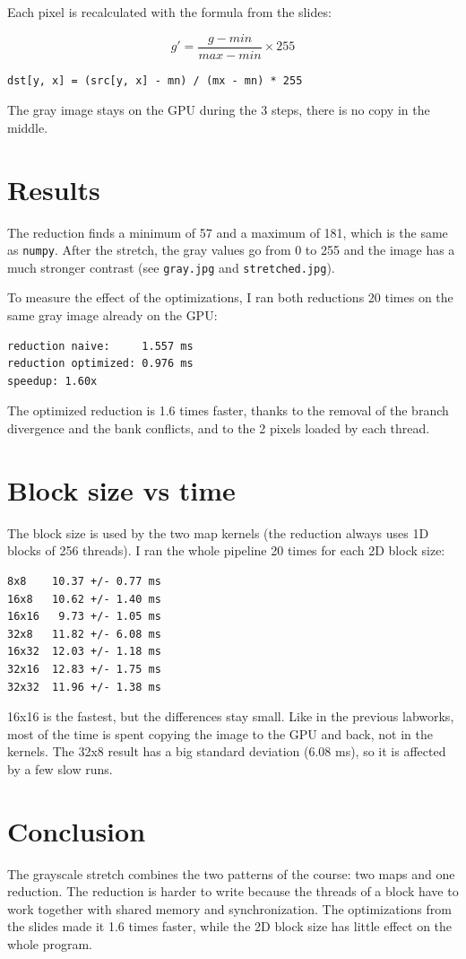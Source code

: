 \documentclass{report}
\begin{document}
Each pixel is recalculated with the formula from the slides:

\[
g' = \frac{g - min}{max - min} \times 255
\]

\begin{verbatim}
dst[y, x] = (src[y, x] - mn) / (mx - mn) * 255
\end{verbatim}

The gray image stays on the GPU during the 3 steps, there is no copy in the middle.

\section*{Results}

The reduction finds a minimum of 57 and a maximum of 181, which is the same as \texttt{numpy}. After the stretch, the gray values go from 0 to 255 and the image has a much stronger contrast (see \texttt{gray.jpg} and \texttt{stretched.jpg}).

To measure the effect of the optimizations, I ran both reductions 20 times on the same gray image already on the GPU:

\begin{verbatim}
reduction naive:     1.557 ms
reduction optimized: 0.976 ms
speedup: 1.60x
\end{verbatim}

The optimized reduction is 1.6 times faster, thanks to the removal of the branch divergence and the bank conflicts, and to the 2 pixels loaded by each thread.

\section*{Block size vs time}

The block size is used by the two map kernels (the reduction always uses 1D blocks of 256 threads). I ran the whole pipeline 20 times for each 2D block size:

\begin{verbatim}
8x8    10.37 +/- 0.77 ms
16x8   10.62 +/- 1.40 ms
16x16   9.73 +/- 1.05 ms
32x8   11.82 +/- 6.08 ms
16x32  12.03 +/- 1.18 ms
32x16  12.83 +/- 1.75 ms
32x32  11.96 +/- 1.38 ms
\end{verbatim}

16x16 is the fastest, but the differences stay small. Like in the previous labworks, most of the time is spent copying the image to the GPU and back, not in the kernels. The 32x8 result has a big standard deviation (6.08 ms), so it is affected by a few slow runs.

\section*{Conclusion}

The grayscale stretch combines the two patterns of the course: two maps and one reduction. The reduction is harder to write because the threads of a block have to work together with shared memory and synchronization. The optimizations from the slides made it 1.6 times faster, while the 2D block size has little effect on the whole program.
\end{document}
